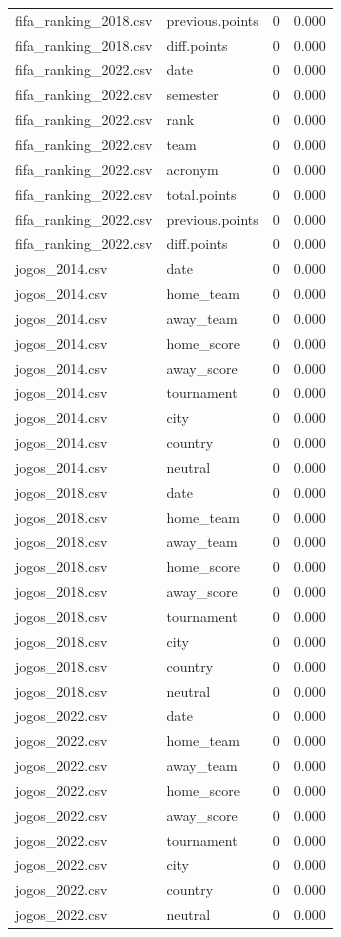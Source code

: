 \begin{tabular}{llll}
fifa\_ranking\_2018.csv & previous.points & 0 & 0.000 \\
fifa\_ranking\_2018.csv & diff.points & 0 & 0.000 \\
fifa\_ranking\_2022.csv & date & 0 & 0.000 \\
fifa\_ranking\_2022.csv & semester & 0 & 0.000 \\
fifa\_ranking\_2022.csv & rank & 0 & 0.000 \\
fifa\_ranking\_2022.csv & team & 0 & 0.000 \\
fifa\_ranking\_2022.csv & acronym & 0 & 0.000 \\
fifa\_ranking\_2022.csv & total.points & 0 & 0.000 \\
fifa\_ranking\_2022.csv & previous.points & 0 & 0.000 \\
fifa\_ranking\_2022.csv & diff.points & 0 & 0.000 \\
jogos\_2014.csv & date & 0 & 0.000 \\
jogos\_2014.csv & home\_team & 0 & 0.000 \\
jogos\_2014.csv & away\_team & 0 & 0.000 \\
jogos\_2014.csv & home\_score & 0 & 0.000 \\
jogos\_2014.csv & away\_score & 0 & 0.000 \\
jogos\_2014.csv & tournament & 0 & 0.000 \\
jogos\_2014.csv & city & 0 & 0.000 \\
jogos\_2014.csv & country & 0 & 0.000 \\
jogos\_2014.csv & neutral & 0 & 0.000 \\
jogos\_2018.csv & date & 0 & 0.000 \\
jogos\_2018.csv & home\_team & 0 & 0.000 \\
jogos\_2018.csv & away\_team & 0 & 0.000 \\
jogos\_2018.csv & home\_score & 0 & 0.000 \\
jogos\_2018.csv & away\_score & 0 & 0.000 \\
jogos\_2018.csv & tournament & 0 & 0.000 \\
jogos\_2018.csv & city & 0 & 0.000 \\
jogos\_2018.csv & country & 0 & 0.000 \\
jogos\_2018.csv & neutral & 0 & 0.000 \\
jogos\_2022.csv & date & 0 & 0.000 \\
jogos\_2022.csv & home\_team & 0 & 0.000 \\
jogos\_2022.csv & away\_team & 0 & 0.000 \\
jogos\_2022.csv & home\_score & 0 & 0.000 \\
jogos\_2022.csv & away\_score & 0 & 0.000 \\
jogos\_2022.csv & tournament & 0 & 0.000 \\
jogos\_2022.csv & city & 0 & 0.000 \\
jogos\_2022.csv & country & 0 & 0.000 \\
jogos\_2022.csv & neutral & 0 & 0.000 \\
\bottomrule
\end{tabular}
